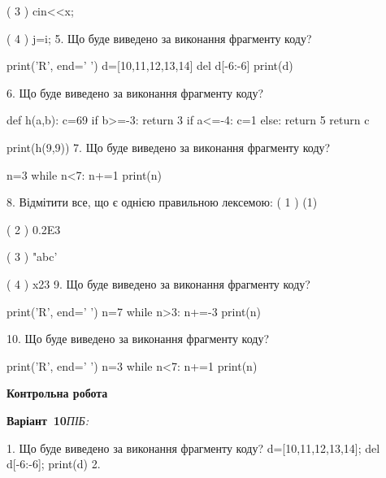 \documentclass[11pt]{article}
\begin{document}
( 3 ) cin<<x;

( 4 ) j=i;
\vspace{5mm}
5. Що буде виведено за виконання фрагменту коду?

print('R', end=' ')
d=[10,11,12,13,14]
del d[-6:-6]
print(d)

\vspace{5mm}
6. Що буде виведено за виконання фрагменту коду?

def h(a,b):
    c=69
    if b>=-3:
        return 3
    if a<=-4:
         c=1
    else: 
        return 5
    return c

print(h(9,9))
\vspace{5mm}
7. Що буде виведено за виконання фрагменту коду?

n=3
while n<7:
    n+=1
print(n)

\vspace{5mm}
8. %
Відмітити все, що є однією правильною лексемою:
( 1 ) (1)

( 2 ) 0.2E3

( 3 ) "abc'

( 4 ) x23
\vspace{5mm}
9. Що буде виведено за виконання фрагменту коду?

print('R', end=' ')
n=7
while n>3:
    n+=-3
print(n)

\vspace{5mm}
10. Що буде виведено за виконання фрагменту коду?

print('R', end=' ')
n=3
while n<7:
    n+=1
print(n)

\vspace{5mm}










\newpage

\newpage

{\large\textbf{Контрольна робота}}

\textbf{Варіант \No\,10}\hfill \textit{ПІБ:}\,\underline{\hspace{60mm}}
\vspace{4mm}

1. Що буде виведено за виконання фрагменту коду?
d=[10,11,12,13,14]; del d[-6:-6]; print(d)\vspace{5mm}
2. 
\end{document}
